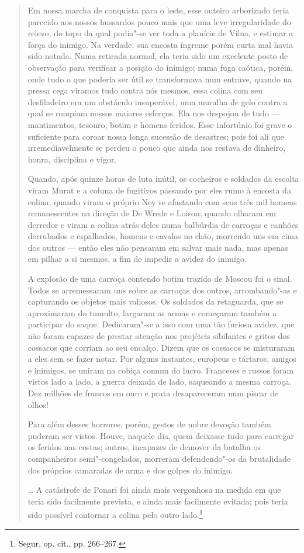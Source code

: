 \begin{quote}
Em nossa marcha de conquista para o leste, esse outeiro arborizado teria
parecido aos nossos hussardos pouco mais que uma leve irregularidade do
relevo, do topo da qual podia"-se ver toda a planície de Vilna, e estimar
a força do inimigo. Na verdade, sua encosta íngreme porém curta mal
havia sido notada. Numa retirada normal, ela teria sido um excelente
posto de observação para verificar a posição do inimigo; numa fuga
caótica, porém, onde tudo o que poderia ser útil se transformava num
entrave, quando na pressa cega viramos tudo contra nós mesmos, essa
colina com seu desfiladeiro era um obstáculo insuperável, uma muralha de
gelo contra a qual se rompiam nossos maiores esforços. Ela nos despojou
de tudo --- mantimentos, tesouro, botim e homens feridos. Esse infortúnio
foi grave o suficiente para coroar nossa longa sucessão de desastres;
pois foi ali que irremediavelmente se perdeu o pouco que ainda nos
restava de dinheiro, honra, disciplina e vigor.

Quando, após quinze horas de luta inútil, os cocheiros e soldados da
escolta viram Murat e a coluna de fugitivos passando por eles rumo à
encosta da colina; quando viram o próprio Ney se afastando com seus três
mil homens remanescentes na direção de De Wrede e Loison; quando olharam
em derredor e viram a colina atrás deles numa balbúrdia de carroças e
canhões derrubados e espalhados, homens e cavalos no chão, morrendo uns
em cima dos outros --- então eles não pensaram em salvar mais nada, mas
apenas em pilhar a si mesmos, a fim de impedir a avidez do inimigo.

A explosão de uma carroça contendo botim trazido de Moscou foi o sinal.
Todos se arremessaram uns sobre as carroças dos outros, arrombando"-as e
capturando os objetos mais valiosos. Os soldados da retaguarda, que se
aproximaram do tumulto, largaram as armas e começaram também a
participar do saque. Dedicaram"-se a isso com uma tão furiosa avidez, que
não foram capazes de prestar atenção nos projéteis sibilantes e gritos
dos cossacos que corriam ao seu encalço. Dizem que os cossacos se
misturaram a eles sem se fazer notar. Por alguns instantes, europeus e
tártaros, amigos e inimigos, se uniram na cobiça comum do lucro.
Franceses e russos foram vistos lado a lado, a guerra deixada de lado,
saqueando a mesma carroça. Dez milhões de francos em ouro e prata
desapareceram num piscar de olhos!

Para além desses horrores, porém, gestos de nobre devoção também puderam
ser vistos. Houve, naquele dia, quem deixasse tudo para carregar os
feridos nas costas; outros, incapazes de demover da batalha os
companheiros semi"-congelados, morreram defendendo"-os da brutalidade dos
próprios camaradas de arma e dos golpes do inimigo.

\ldots{} A catástrofe de Ponari foi ainda mais vergonhosa na medida em
que teria sido facilmente prevista, e ainda mais facilmente evitada;
pois teria sido possível contornar a colina pelo outro lado.\footnote{Segur, op. cit., pp. 266--267.} 
\end{quote}

